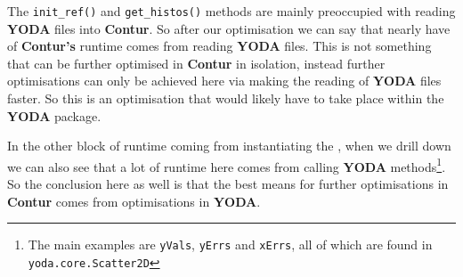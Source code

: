 The \texttt{init\_ref()} and \texttt{get\_histos()} methods are mainly preoccupied with reading \textbf{YODA} files into \textbf{Contur}. So after our optimisation we can say that nearly have of \textbf{Contur's} runtime comes from reading \textbf{YODA} files. This is not something that can be further optimised in \textbf{Contur} in isolation, instead further optimisations can only be achieved here via making the reading of \textbf{YODA} files faster. So this is an optimisation that would likely have to take place within the \textbf{YODA} package.

In the other block of runtime coming from instantiating the , when we drill down we can also see that a lot of runtime here comes from calling \textbf{YODA} methods\footnote{The main examples are \texttt{yVals}, \texttt{yErrs} and \texttt{xErrs}, all of which are found in \texttt{yoda.core.Scatter2D}}. So the conclusion here as well is that the best means for further optimisations in \textbf{Contur} comes from optimisations in  \textbf{YODA}.
